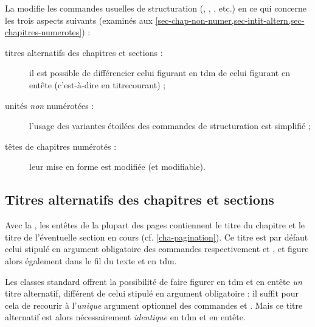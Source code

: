 La \yatCl{} modifie les commandes usuelles de structuration
(, , ,
etc.)  en ce qui concerne les trois aspects suivants (examinés aux
\vref{sec-chap-non-numer,sec-intit-altern,sec-chapitres-numerotes}) :
\begin{description}
\item[titres alternatifs des chapitres et sections :] il est possible de
  différencier celui figurant en \gls{tdm} de celui figurant en
  entête (c'est-à-dire en \gls{titrecourant}) ;
\item[unités \emph{non} numérotées :] l'usage des variantes étoilées des
  commandes de structuration est simplifié ;
\item[têtes de chapitres numérotés :] leur mise en forme est modifiée (et
  modifiable).
\end{description}

\subsection{Titres alternatifs des chapitres et sections}
\label{sec-intit-altern}
%
%

%

Avec la \yatCl{}, les entêtes de la plupart des pages contiennent le titre du
chapitre et le titre de l'éventuelle section en cours
(cf. \vref{cha-pagination}).
%
Ce titre est par défaut celui stipulé en argument obligatoire des commandes
respectivement  et , et figure
alors également dans le fil du texte et en \gls{tdm}\signet{}.

%
Les classes standard offrent la possibilité de faire figurer en
\gls{tdm}\signet{} et en entête \emph{un} titre alternatif, différent de celui
stipulé en argument obligatoire : il suffit pour cela de recourir
à l'\emph{unique} argument optionnel des commandes  et
. Mais ce titre alternatif est alors nécessairement
\emph{identique} en \gls{tdm}\signet{} et en entête.

